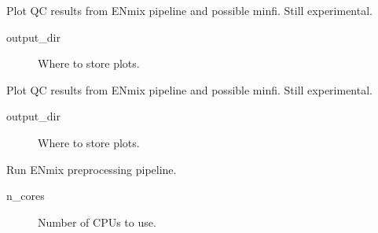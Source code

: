 \documentclass[letterpaper,10pt,english]{sphinxmanual}
\begin{document}
\begin{fulllineitems}
\begin{fulllineitems}
\label{\detokenize{index:pymethylprocess.PreProcessDataTypes.PreProcessIDAT.plot_original_qc}}
Plot QC results from ENmix pipeline and possible minfi. Still experimental.
\begin{description}
\item[{output\_dir}] \leavevmode
Where to store plots.

\end{description}

\end{fulllineitems}


\begin{fulllineitems}
\label{\detokenize{index:pymethylprocess.PreProcessDataTypes.PreProcessIDAT.plot_qc_metrics}}
Plot QC results from ENmix pipeline and possible minfi. Still experimental.
\begin{description}
\item[{output\_dir}] \leavevmode
Where to store plots.

\end{description}

\end{fulllineitems}


\begin{fulllineitems}
\label{\detokenize{index:pymethylprocess.PreProcessDataTypes.PreProcessIDAT.preprocessENmix}}
Run ENmix preprocessing pipeline.
\begin{description}
\item[{n\_cores}] \leavevmode
Number of CPUs to use.

\end{description}

\end{fulllineitems}


\end{fulllineitems}
\end{document}
